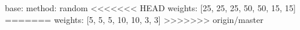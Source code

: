base:
  method: random
<<<<<<< HEAD
  weights: [25, 25, 25, 50, 50, 15, 15]
=======
  weights: [5, 5, 5, 10, 10, 3, 3]
>>>>>>> origin/master
